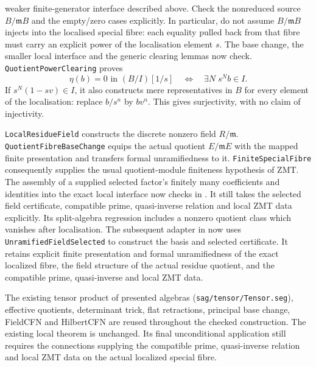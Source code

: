 \documentclass[11pt]{article}
\begin{document}
\begin{enumerate}
weaker finite-generator interface described above.  Check the
nonreduced source $B/\mathfrak mB$ and the empty/zero cases explicitly.
In particular, do not assume $B/\mathfrak mB$ injects into the
localised special fibre: each equality pulled back from that fibre
must carry an explicit power of the localisation element $s$.
The base change, the smaller local interface and the generic clearing
lemmas now check. \texttt{QuotientPowerClearing} proves
\[
 \eta(b)=0\text{ in }(B/I)[1/s]
 \quad\Longleftrightarrow\quad
 \exists N\;s^N b\in I.
\]
If $s^N(1-sv)\in I$, it also constructs mere representatives in $B$
for every element of the localisation: replace $b/s^n$ by $bv^n$.
This gives surjectivity, with no claim of injectivity.

\texttt{LocalResidueField} constructs the discrete nonzero field
$R/\mathfrak m$. \texttt{QuotientFibreBaseChange} equips the actual
quotient $E/\mathfrak mE$ with the mapped finite presentation and transfers
formal unramifiedness to it. \texttt{FiniteSpecialFibre} consequently
supplies the usual quotient-module finiteness hypothesis of ZMT.
The assembly of a supplied selected factor's finitely many coefficients
and identities into the exact local interface now checks in
. It still takes the selected field
certificate, compatible prime, quasi-inverse relation and local ZMT
data explicitly. Its split-algebra regression includes a nonzero
quotient class which vanishes after localisation.
The subsequent adapter in  now
uses \texttt{UnramifiedFieldSelected} to construct the basis and selected
certificate. It retains explicit finite presentation and formal
unramifiedness of the exact localized fibre, the field structure of the
actual residue quotient, and the compatible prime, quasi-inverse and
local ZMT data.
\end{enumerate}

The existing tensor product of presented algebras
(\texttt{sag/tensor/Tensor.seg}), effective quotients, determinant
trick, flat retractions, principal base change, FieldCFN and HilbertCFN
are reused throughout the checked construction. The existing local
theorem is unchanged. Its final unconditional application still requires
the connections supplying the compatible prime, quasi-inverse relation
and local ZMT data on the actual localized special fibre.
\end{document}
